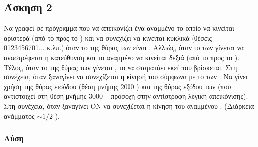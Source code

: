 \newpage\subsection*{Άσκηση 2}

Να γραφεί σε  πρόγραμμα που να απεικονίζει ένα αναμμένο 
το οποίο να 
κινείται  αριστερά  (από  το    προς  το  )  και  να  συνεχίζει  να  κινείται  κυκλικά  (θέσεις   
0123456701... κ.λπ.) όταν το 
 της θύρας των  είναι . Αλλιώς, όταν το 
 των  γίνεται  να αναστρέφεται η κατεύθυνση και το αναμμένο  να κινείται δεξιά (από το 
 προς το ). Τέλος, όταν το  της θύρας των  γίνεται ,
το  να σταματάει εκεί που βρίσκεται. 
Στη συνέχεια, όταν ξαναγίνει  να συνεχίζεται η κίνησή του σύμφωνα με το 
 των .
Να γίνει χρήση της θύρας εισόδου  (θέση μνήμης 2000 
) και της θύρας εξόδου των 
 (που αντιστοιχεί στη θέση μνήμης 3000 
–
προσοχή στην αντίστροφη λογική απεικόνισης). 
Στη συνέχεια, όταν ξαναγίνει ON να συνεχίζεται η κίνηση του αναμμένου . 
(Διάρκεια ανάμματος $\sim 1/2$ ). 

\subsubsection*{Λύση}

\inputminted{text}{askisi2.8085}


